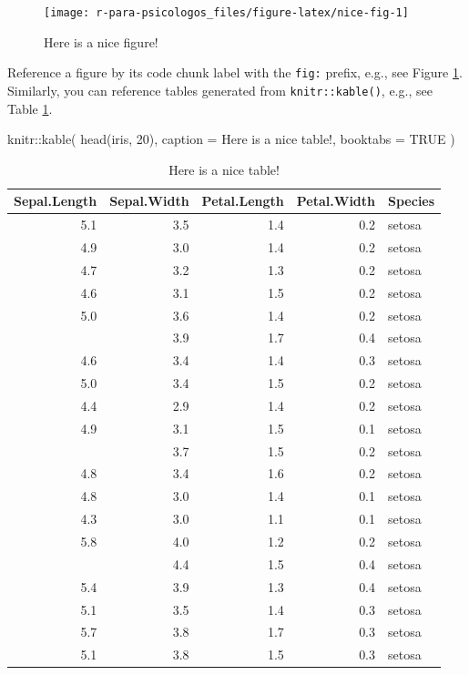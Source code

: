 \documentclass[
]{book}
\newenvironment{Shaded}{\begin{snugshade}}{\end{snugshade}}
\newcommand{\AttributeTok}[1]{\textcolor[rgb]{0.77,0.63,0.00}{#1}}
\newcommand{\ConstantTok}[1]{\textcolor[rgb]{0.00,0.00,0.00}{#1}}
\newcommand{\DecValTok}[1]{\textcolor[rgb]{0.00,0.00,0.81}{#1}}
\newcommand{\FunctionTok}[1]{\textcolor[rgb]{0.00,0.00,0.00}{#1}}
\newcommand{\NormalTok}[1]{#1}
\newcommand{\SpecialCharTok}[1]{\textcolor[rgb]{0.00,0.00,0.00}{#1}}
\newcommand{\StringTok}[1]{\textcolor[rgb]{0.31,0.60,0.02}{#1}}
\begin{document}
\begin{figure}

{\centering \texttt{[image: r-para-psicologos\_files/figure-latex/nice-fig-1]} 

}

\caption{Here is a nice figure!}\label{fig:nice-fig}
\end{figure}

Reference a figure by its code chunk label with the \texttt{fig:} prefix, e.g., see Figure \ref{fig:nice-fig}. Similarly, you can reference tables generated from \texttt{knitr::kable()}, e.g., see Table \ref{tab:nice-tab}.

\begin{Shaded}
\begin{Highlighting}[]
\NormalTok{knitr}\SpecialCharTok{::}\FunctionTok{kable}\NormalTok{(}
  \FunctionTok{head}\NormalTok{(iris, }\DecValTok{20}\NormalTok{), }\AttributeTok{caption =} \StringTok{\textquotesingle{}Here is a nice table!\textquotesingle{}}\NormalTok{,}
  \AttributeTok{booktabs =} \ConstantTok{TRUE}
\NormalTok{)}
\end{Highlighting}
\end{Shaded}

\begin{table}

\caption{\label{tab:nice-tab}Here is a nice table!}
\centering
\begin{tabular}[t]{rrrrl}
\toprule
Sepal.Length & Sepal.Width & Petal.Length & Petal.Width & Species\\
\midrule
5.1 & 3.5 & 1.4 & 0.2 & setosa\\
4.9 & 3.0 & 1.4 & 0.2 & setosa\\
4.7 & 3.2 & 1.3 & 0.2 & setosa\\
4.6 & 3.1 & 1.5 & 0.2 & setosa\\
5.0 & 3.6 & 1.4 & 0.2 & setosa\\
\addlinespace
5.4 & 3.9 & 1.7 & 0.4 & setosa\\
4.6 & 3.4 & 1.4 & 0.3 & setosa\\
5.0 & 3.4 & 1.5 & 0.2 & setosa\\
4.4 & 2.9 & 1.4 & 0.2 & setosa\\
4.9 & 3.1 & 1.5 & 0.1 & setosa\\
\addlinespace
5.4 & 3.7 & 1.5 & 0.2 & setosa\\
4.8 & 3.4 & 1.6 & 0.2 & setosa\\
4.8 & 3.0 & 1.4 & 0.1 & setosa\\
4.3 & 3.0 & 1.1 & 0.1 & setosa\\
5.8 & 4.0 & 1.2 & 0.2 & setosa\\
\addlinespace
5.7 & 4.4 & 1.5 & 0.4 & setosa\\
5.4 & 3.9 & 1.3 & 0.4 & setosa\\
5.1 & 3.5 & 1.4 & 0.3 & setosa\\
5.7 & 3.8 & 1.7 & 0.3 & setosa\\
5.1 & 3.8 & 1.5 & 0.3 & setosa\\
\bottomrule
\end{tabular}
\end{table}
\end{document}
